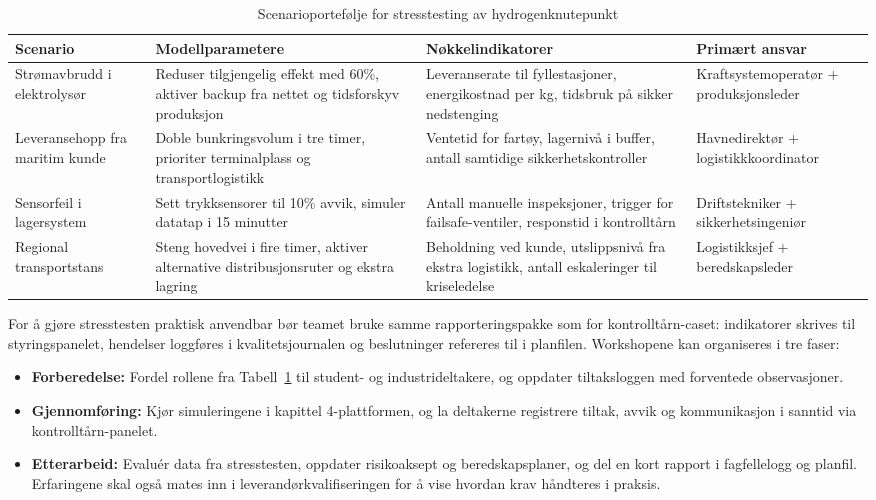 \begin{table}[ht]
    \centering
    \caption{Scenarioportefølje for stresstesting av hydrogenknutepunkt}
    \label{tab:hydrogenstress}
    \begin{tabular}{|p{3.2cm}|p{4.6cm}|p{4.6cm}|p{3.0cm}|}
        \hline
        \textbf{Scenario} & \textbf{Modellparametere} & \textbf{Nøkkelindikatorer} & \textbf{Primært ansvar} \\
        \hline
        Strømavbrudd i elektrolysør & Reduser tilgjengelig effekt med 60\%, aktiver backup fra nettet og tidsforskyv produksjon & Leveranserate til fyllestasjoner, energikostnad per kg, tidsbruk på sikker nedstenging & Kraftsystemoperatør + produksjonsleder \\
        \hline
        Leveransehopp fra maritim kunde & Doble bunkringsvolum i tre timer, prioriter terminalplass og transportlogistikk & Ventetid for fartøy, lagernivå i buffer, antall samtidige sikkerhetskontroller & Havnedirektør + logistikkkoordinator \\
        \hline
        Sensorfeil i lagersystem & Sett trykksensorer til \pm{}10\% avvik, simuler datatap i 15 minutter & Antall manuelle inspeksjoner, trigger for failsafe-ventiler, responstid i kontrolltårn & Driftstekniker + sikkerhetsingeniør \\
        \hline
        Regional transportstans & Steng hovedvei i fire timer, aktiver alternative distribusjonsruter og ekstra lagring & Beholdning ved kunde, utslippsnivå fra ekstra logistikk, antall eskaleringer til kriseledelse & Logistikksjef + beredskapsleder \\
        \hline
    \end{tabular}
\end{table}

For å gjøre stresstesten praktisk anvendbar bør teamet bruke samme rapporteringspakke som for kontrolltårn-caset: indikatorer skrives til styringspanelet, hendelser loggføres i kvalitetsjournalen og beslutninger refereres til i planfilen. Workshopene kan organiseres i tre faser:
\begin{itemize}
    \item \textbf{Forberedelse:} Fordel rollene fra Tabell~\ref{tab:hydrogenstress} til student- og industrideltakere, og oppdater tiltaksloggen med forventede observasjoner.
    \item \textbf{Gjennomføring:} Kjør simuleringene i kapittel 4-plattformen, og la deltakerne registrere tiltak, avvik og kommunikasjon i sanntid via kontrolltårn-panelet.
    \item \textbf{Etterarbeid:} Evaluér data fra stresstesten, oppdater risikoaksept og beredskapsplaner, og del en kort rapport i fagfellelogg og planfil. Erfaringene skal også mates inn i leverandørkvalifiseringen for å vise hvordan krav håndteres i praksis.
\end{itemize}

